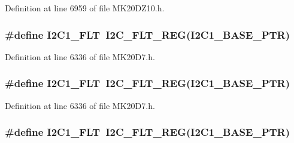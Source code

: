 Definition at line 6959 of file M\+K20\+D\+Z10.\+h.

\subsubsection[{\texorpdfstring{I2\+C1\+\_\+\+F\+LT}{I2C1_FLT}}]{\setlength{\rightskip}{0pt plus 5cm}\#define I2\+C1\+\_\+\+F\+LT~{\bf I2\+C\+\_\+\+F\+L\+T\+\_\+\+R\+EG}({\bf I2\+C1\+\_\+\+B\+A\+S\+E\+\_\+\+P\+TR})}\hypertarget{group___i2_c___register___accessor___macros_gaddb39b793fc611a3fd107eaf33c26598}{}\label{group___i2_c___register___accessor___macros_gaddb39b793fc611a3fd107eaf33c26598}


Definition at line 6336 of file M\+K20\+D7.\+h.

\subsubsection[{\texorpdfstring{I2\+C1\+\_\+\+F\+LT}{I2C1_FLT}}]{\setlength{\rightskip}{0pt plus 5cm}\#define I2\+C1\+\_\+\+F\+LT~{\bf I2\+C\+\_\+\+F\+L\+T\+\_\+\+R\+EG}({\bf I2\+C1\+\_\+\+B\+A\+S\+E\+\_\+\+P\+TR})}\hypertarget{group___i2_c___register___accessor___macros_gaddb39b793fc611a3fd107eaf33c26598}{}\label{group___i2_c___register___accessor___macros_gaddb39b793fc611a3fd107eaf33c26598}


Definition at line 6336 of file M\+K20\+D7.\+h.

\subsubsection[{\texorpdfstring{I2\+C1\+\_\+\+F\+LT}{I2C1_FLT}}]{\setlength{\rightskip}{0pt plus 5cm}\#define I2\+C1\+\_\+\+F\+LT~{\bf I2\+C\+\_\+\+F\+L\+T\+\_\+\+R\+EG}({\bf I2\+C1\+\_\+\+B\+A\+S\+E\+\_\+\+P\+TR})}\hypertarget{group___i2_c___register___accessor___macros_gaddb39b793fc611a3fd107eaf33c26598}{}\label{group___i2_c___register___accessor___macros_gaddb39b793fc611a3fd107eaf33c26598}


